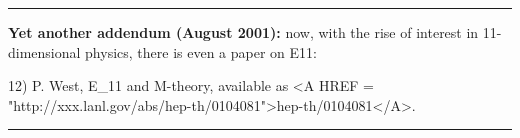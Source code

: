 \par\noindent\rule{\textwidth}{0.4pt}
\textbf{Yet another addendum (August 2001):} now, with the rise of interest
in 11-dimensional physics, there is even a paper on E11:

12) P. West, E_{11} and M-theory, available as <A HREF = "http://xxx.lanl.gov/abs/hep-th/0104081">hep-th/0104081</A>.
\par\noindent\rule{\textwidth}{0.4pt}

